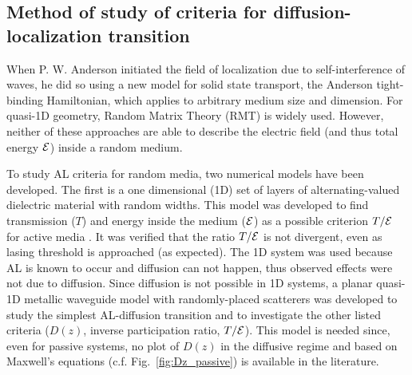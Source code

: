 \subsection{Method of study of criteria for diffusion-localization transition}
\label{sec:method_numerical}
When P. W. Anderson initiated the field of localization due to self-interference of waves, he did so using a new model for solid state transport, the Anderson tight-binding Hamiltonian\cite{1958_Anderson}, which applies to arbitrary medium size and dimension. For quasi-1D geometry, Random Matrix Theory (RMT)\cite{1951_Wigner} %
\cite{1997_Beenakker} %
is widely used. However, neither of these approaches are able to describe the electric field (and thus total energy ${\cal E}$) inside a random medium.

To study AL criteria for random media, two numerical models have been developed. The first is a one dimensional (1D) set of layers of alternating-valued dielectric material with random widths. This model was developed to find transmission ($T$) and energy inside the medium (${\cal E}$) as a possible criterion $T/{\cal E}$ for active media\cite{2009_Payne_TE} \cite{2009_Payne_loc_criterion}. It was verified that the ratio $T/{\cal E}$ is not divergent, even as lasing threshold is approached (as expected). The 1D system was used because AL is known to occur and diffusion can not happen, thus observed effects were not due to diffusion.
Since diffusion is not possible in 1D systems, a planar quasi-1D metallic waveguide model with randomly-placed scatterers was developed to study the simplest AL-diffusion transition and to investigate the other listed criteria ($D(z)$, inverse participation ratio, $T/{\cal E}$).  This model is needed since, even for passive systems, no plot of $D(z)$ in the diffusive regime and based on Maxwell's equations (c.f. Fig.~\ref{fig:Dz_passive}) is available in the literature.

